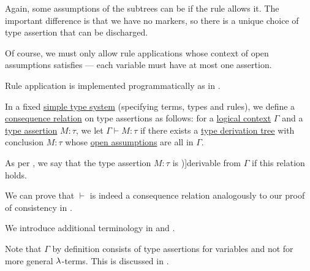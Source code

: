 \begin{definition}
\begin{thmenum}[resume=def:type_derivation_tree]
    Again, some assumptions of the subtrees can be  if the rule allows it. The important difference is that we have no markers, so there is a unique choice of type assertion that can be discharged.

    Of course, we must only allow rule applications whose context of open assumptions satisfies  --- each variable must have at most one assertion.
  \end{thmenum}
\end{definition}
\begin{comments}
  \item Rule application is implemented programmatically as  in \cite{notebook:code}.
\end{comments}

\begin{definition}\label{def:simple_type_derivability}\mimprovised
  In a fixed \hyperref[def:simple_type_system]{simple type system} (specifying terms, types and rules), we define a \hyperref[def:consequence_relation]{consequence relation} on type assertions as follows: for a \hyperref[def:logical_context]{logical context} \( \Gamma \) and a \hyperref[def:type_assertion]{type assertion} \( M: \tau \), we let \( \Gamma \vdash M: \tau \) if there exists a \hyperref[def:type_derivation_tree]{type derivation tree} with conclusion \( M: \tau \) whose \hyperref[def:natural_deduction_proof_tree/context]{open assumptions} are all in \( \Gamma \).

  As per , we say that the type assertion \( M: \tau \) is \term[en=derivable (\cite[def. 3.1.4]{Barendregt1992Types})]{derivable} from \( \Gamma \) if this relation holds.
\end{definition}
\begin{defproof}
  We can prove that \( {\vdash} \) is indeed a consequence relation analogously to our proof of consistency in .
\end{defproof}
\begin{comments}
  \item We introduce additional terminology in  and .

  \item Note that \( \Gamma \) by definition consists of type assertions for variables and not for more general \( \mathrm{\lambda} \)-terms. This is discussed in .
\end{comments}

